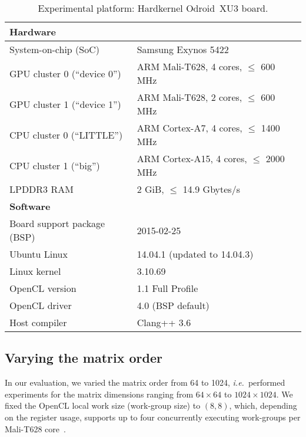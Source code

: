 \documentclass{acm_proc_article-sp} %
\begin{document}
\begin{table*}
\centering
\caption{\label{Odroid}Experimental platform: Hardkernel Odroid~XU3 board.}
  \begin{tabular}{ll}
  \toprule
  {\bf Hardware}   &\\
  \midrule
  System-on-chip (SoC)         & Samsung Exynos 5422                     \\
  GPU cluster 0 (``device 0'') & ARM Mali-T628,  4 cores, $\le$ 600 MHz  \\
  GPU cluster 1 (``device 1'') & ARM Mali-T628,  2 cores, $\le$ 600 MHz  \\
  CPU cluster 0 (``LITTLE'')   & ARM Cortex-A7,  4 cores, $\le$ 1400 MHz \\
  CPU cluster 1 (``big'')      & ARM Cortex-A15, 4 cores, $\le$ 2000 MHz \\
  LPDDR3 RAM                   & 2 GiB, $\le$ 14.9 Gbytes/s              \\
  \midrule
  {\bf Software}   &\\
  \midrule
  Board support package (BSP)  & 2015-02-25                    \\
  Ubuntu Linux                 & 14.04.1 (updated to 14.04.3)  \\
  Linux kernel                 & 3.10.69                       \\
  OpenCL version               & 1.1 Full Profile              \\
  OpenCL driver                & 4.0 (BSP default)             \\
  Host compiler                & Clang++ 3.6                   \\
  \bottomrule
  \end{tabular}
\end{table*}


\subsection{Varying the matrix order}


In our evaluation, we varied the matrix order from 64 to 1024,
{\em i.e.}\ performed experiments for the matrix dimensions ranging from $64
\times 64$ to $1024 \times 1024$.
%
We fixed the OpenCL local work size (work-group size) to $(8,8)$, which,
depending on the register usage, supports up to four concurrently executing
work-groups per Mali-T628 core~\cite{Gronqvist:2014}.
\end{document}
